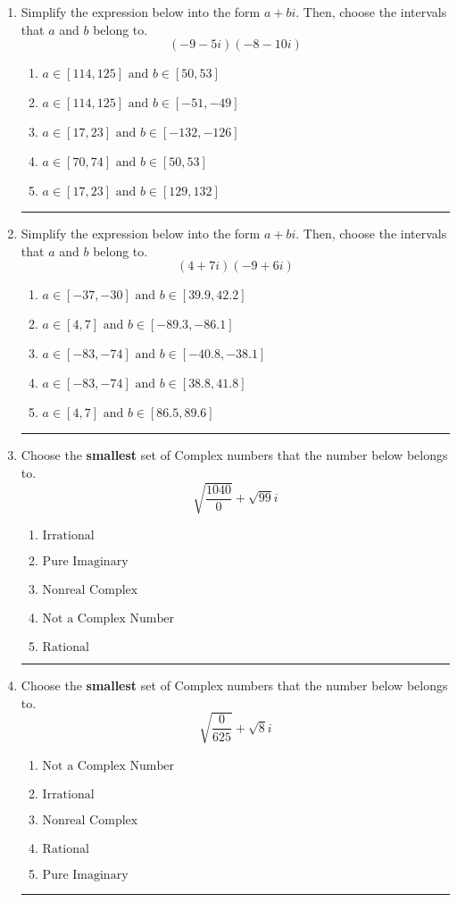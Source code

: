\documentclass[14pt]{extbook}
\newcommand{\litem}[1]{\item#1\hspace*{-1cm}\rule{\textwidth}{0.4pt}}
\begin{document}
\begin{enumerate}
{\begin{enumerate}[label=\Alph*.]
\end{enumerate} }
\litem{
Simplify the expression below into the form $a+bi$. Then, choose the intervals that $a$ and $b$ belong to.\[ (-9 - 5 i)(-8 - 10 i) \]\begin{enumerate}[label=\Alph*.]
\item \( a \in [114, 125] \text{ and } b \in [50, 53] \)
\item \( a \in [114, 125] \text{ and } b \in [-51, -49] \)
\item \( a \in [17, 23] \text{ and } b \in [-132, -126] \)
\item \( a \in [70, 74] \text{ and } b \in [50, 53] \)
\item \( a \in [17, 23] \text{ and } b \in [129, 132] \)

\end{enumerate} }
\litem{
Simplify the expression below into the form $a+bi$. Then, choose the intervals that $a$ and $b$ belong to.\[ (4 + 7 i)(-9 + 6 i) \]\begin{enumerate}[label=\Alph*.]
\item \( a \in [-37, -30] \text{ and } b \in [39.9, 42.2] \)
\item \( a \in [4, 7] \text{ and } b \in [-89.3, -86.1] \)
\item \( a \in [-83, -74] \text{ and } b \in [-40.8, -38.1] \)
\item \( a \in [-83, -74] \text{ and } b \in [38.8, 41.8] \)
\item \( a \in [4, 7] \text{ and } b \in [86.5, 89.6] \)

\end{enumerate} }
\litem{
Choose the \textbf{smallest} set of Complex numbers that the number below belongs to.\[ \sqrt{\frac{1040}{0}}+\sqrt{99} i \]\begin{enumerate}[label=\Alph*.]
\item \( \text{Irrational} \)
\item \( \text{Pure Imaginary} \)
\item \( \text{Nonreal Complex} \)
\item \( \text{Not a Complex Number} \)
\item \( \text{Rational} \)

\end{enumerate} }
\litem{
Choose the \textbf{smallest} set of Complex numbers that the number below belongs to.\[ \sqrt{\frac{0}{625}}+\sqrt{8}i \]\begin{enumerate}[label=\Alph*.]
\item \( \text{Not a Complex Number} \)
\item \( \text{Irrational} \)
\item \( \text{Nonreal Complex} \)
\item \( \text{Rational} \)
\item \( \text{Pure Imaginary} \)


\end{enumerate}}
\end{enumerate}
\end{document}
